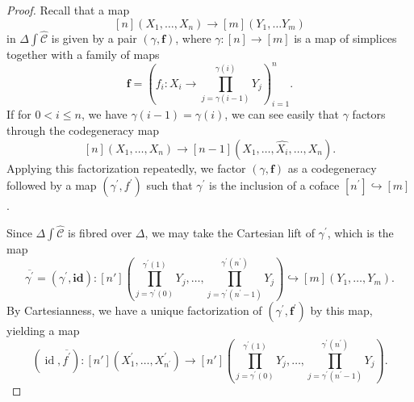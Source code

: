 \documentclass[a4paper]{article}
\numberwithin{equation}{subsection}
\theoremstyle{plain}   %
\theoremstyle{definition}
\theoremstyle{remark}
\theoremstyle{plain}
\DeclareMathOperator{\id}{id}
\newcommand{\psh}[1]{\ensuremath{\widehat{#1}}}
\providecommand{\C}{}
\renewcommand{\C}{\ensuremath{\mathcal{C}}}
\begin{document}
\begin{proof}
	Recall that a map \[[n](X_1,\dots, X_n) \to [m](Y_1,\dots Y_m)\] in \(\Delta \int \psh{\C}\) is given by a pair \((\gamma,	\mathbf{f})\), where \(\gamma:[n]\to [m]\) is a map of simplices together with a family of maps \[\mathbf{f}=\left(f_i: 	X_i \to \prod_{j=\gamma(i-1)}^{\gamma(i)}Y_j\right)_{i=1}^n.\]
	If for \(0<i\leq n\), we have \(\gamma(i-1)=\gamma(i)\), we can see easily that \(\gamma\) factors through the 	codegeneracy map \[[n](X_1,\dots,X_n)\to [n-1](X_1,\dots,\psh{X_i},\dots,X_n).\]  Applying this factorization repeatedly, 	we factor \((\gamma,\mathbf{f})\) as a codegeneracy followed by a map \((\gamma^\prime,f^\prime)\) such that \(\gamma^\prime\) is the inclusion of a coface \([n^\prime]\hookrightarrow [m]\).

	Since \(\Delta\int \psh{\C}\) is fibred over \(\Delta\), we may take the Cartesian lift of \(\gamma^\prime\), which is 	the map \[\overline{\gamma^\prime}=(\gamma^\prime,\mathbf{id}):[n']\left(\prod_{j=\gamma^\prime(0)}^{\gamma^\prime(1)}Y_j,	 \dots, \prod_{j=\gamma^\prime(n^\prime-1)}^{\gamma^\prime(n^\prime)} Y_j \right)\hookrightarrow [m](Y_1,\dots,Y_m).\]  	By Cartesianness, we have a unique factorization of \((\gamma^\prime,\mathbf{f^\prime})\) by this map, yielding a map \[	(\id,\overline{f^\prime}):[n'](X^\prime_1,\dots,X^\prime_{n^\prime})\to [n']\left(\prod_{j=\gamma^\prime(0)}^	{\gamma^\prime(1)}Y_j, \dots, \prod_{j=\gamma^\prime(n^\prime-1)}^{\gamma^\prime(n^\prime)} Y_j \right).\]


\end{proof}
\end{document}
